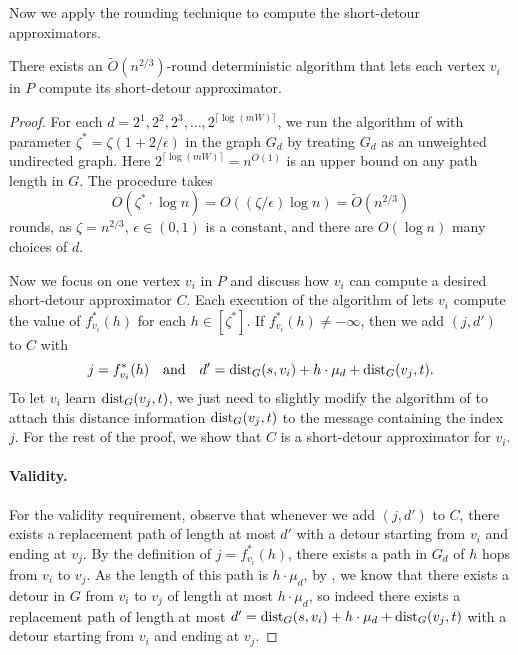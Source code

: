 Now we apply the rounding technique to compute the short-detour approximators.

\begin{lemma}
\label{lem:rounding}
There exists an $\widetilde{O}(n^{2/3})$-round deterministic algorithm that lets each vertex $v_i$ in $P$ compute its short-detour approximator.
\end{lemma}

\begin{proof}
For each $d = 2^1, 2^2, 2^3, \ldots, 2^{\lceil \log (mW) \rceil}$, we run the algorithm of  with parameter $\zeta^\ast = \zeta(1+2/\epsilon)$ in the graph $G_d$ by treating $G_d$ as an unweighted undirected graph. Here $2^{\lceil \log (mW) \rceil} = n^{O(1)}$ is an upper bound on any path length in $G$. The procedure takes \[O(\zeta^\ast \cdot \log n) = O((\zeta/\epsilon) \log n)= \widetilde{O}(n^{2/3})\] rounds, as $\zeta = n^{2/3}$, $\epsilon \in (0,1)$ is a constant, and there are $O(\log n)$ many choices of $d$.

Now we focus on one vertex $v_i$ in $P$ and discuss how $v_i$ can compute a desired short-detour approximator $C$.
Each execution of the algorithm of  lets 
 $v_i$ compute the value of  $f_{v_i}^\ast(h)$ for each $h \in [\zeta^\ast]$. If $f_{v_i}^\ast(h) \neq -\infty$, then we add $(j, d')$ to $C$ with 
\[ j = f_{v_i}^\ast(h) \ \ \ \text{and} \ \ \ d' = \dist_G(s, v_i) + h\cdot \mu_d + \dist_G(v_{j},t).\]
To let $v_i$ learn $\operatorname{dist}_G(v_{j},t)$, we just need to slightly modify the algorithm of  to attach this distance information $\operatorname{dist}_G(v_{j},t)$ to the message containing the index $j$. For the rest of the proof, we show that $C$ is a short-detour approximator for $v_i$. 

\paragraph{Validity.} For the validity requirement, observe that whenever we add $(j, d')$ to $C$, there exists a replacement path of length at most $d'$ with a detour starting from $v_i$ and ending at $v_j$. By the definition of $j = f_{v_i}^\ast(h)$, there exists a path in $G_d$ of $h$ hops from $v_i$ to $v_j$. As the length of this path is $h\cdot \mu_d$, by , we know that there exists a detour in $G$ from $v_i$ to $v_j$ of length at most $h\cdot \mu_d$, so indeed there exists a replacement path of length at most $d' = \operatorname{dist}_G(s, v_i) + h\cdot \mu_d + \operatorname{dist}_G(v_{j},t)$ with a detour starting from $v_i$ and ending at $v_j$.


\end{proof}
